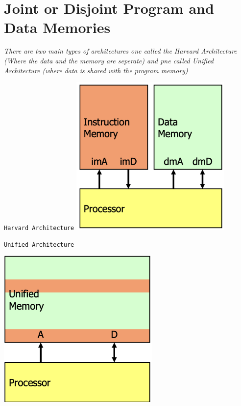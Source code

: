 \section{Joint or Disjoint Program and Data Memories}
\textit{There are two main types of architectures one called the Harvard Architecture (Where the data and the memory are seperate) and pne called Unified Architecture (where data is shared with the program memory)} \newline
\vspace*{10px}
\begin{minipage}[htp]{0.4\textwidth}
    \texttt{Harvard Architecture} \newline
    \vspace*{2px}
    \centering
    \includegraphics[width=0.6\textwidth]{chapters/chapter1a/images/harvard.png}
\end{minipage}
\hfill
\vline
\hfill
\begin{minipage}[htp]{0.4\textwidth}
    \texttt{Unified Architecture} \newline    
    \vspace*{2px}

    \centering
    \includegraphics[width=0.6\textwidth]{chapters/chapter1a/images/unified.png}
\end{minipage}
\newpage
